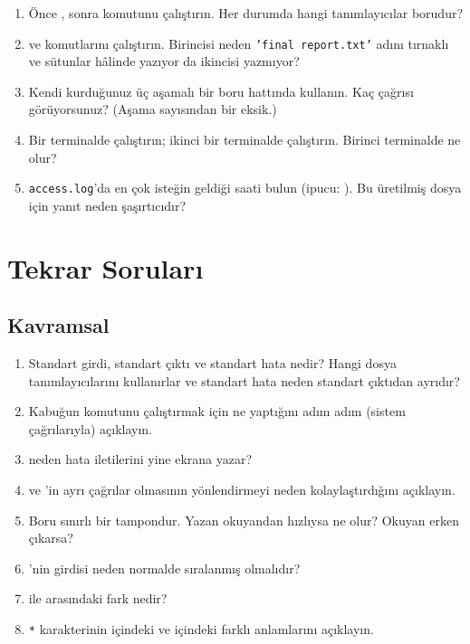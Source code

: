 \begin{tryit}
\begin{enumerate}[leftmargin=1.4em]
  \item Önce , sonra  komutunu çalıştırın. Her durumda hangi tanımlayıcılar borudur?
  \item {} ve  komutlarını çalıştırın. Birincisi neden \texttt{'final report.txt'} adını tırnaklı ve sütunlar hâlinde yazıyor da ikincisi yazmıyor?
  \item Kendi kurduğunuz üç aşamalı bir boru hattında  kullanın. Kaç  çağrısı görüyorsunuz? (Aşama sayısından bir eksik.)
  \item Bir terminalde  çalıştırın; ikinci bir terminalde  çalıştırın. Birinci terminalde ne olur?
  \item \texttt{access.log}'da en çok isteğin geldiği saati bulun (ipucu: ). Bu üretilmiş dosya için yanıt neden şaşırtıcıdır?
\end{enumerate}
\end{tryit}

\section{Tekrar Soruları}

\subsection*{Kavramsal}
\begin{enumerate}[leftmargin=1.6em]
  \item Standart girdi, standart çıktı ve standart hata nedir? Hangi dosya tanımlayıcılarını kullanırlar ve standart hata neden standart çıktıdan ayrıdır?
  \item Kabuğun  komutunu çalıştırmak için ne yaptığını adım adım (sistem çağrılarıyla) açıklayın.
  \item {} neden hata iletilerini yine ekrana yazar?
  \item {} ve 'in ayrı çağrılar olmasının yönlendirmeyi neden kolaylaştırdığını açıklayın.
  \item Boru sınırlı bir tampondur. Yazan okuyandan hızlıysa ne olur? Okuyan erken çıkarsa?
  \item {}'nin girdisi neden normalde sıralanmış olmalıdır?
  \item {} ile  arasındaki fark nedir?
  \item \texttt{*} karakterinin  içindeki ve  içindeki farklı anlamlarını açıklayın.
\end{enumerate}

